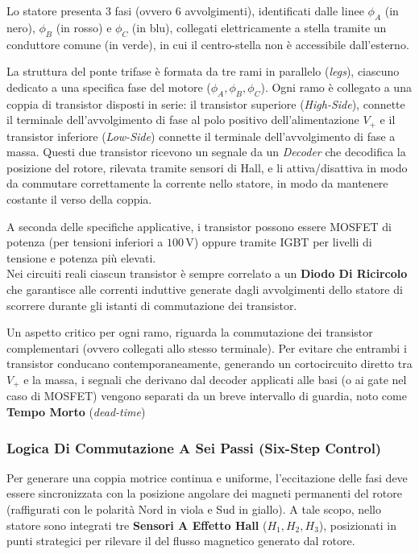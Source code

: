 ﻿\documentclass[11pt, a4paper]{article}
\begin{document}
Lo statore presenta 3 fasi (ovvero 6 avvolgimenti), identificati dalle linee $\phi_A$ (in nero), $\phi_B$ (in rosso) e $\phi_C$ (in blu), collegati elettricamente a stella tramite un conduttore comune (in verde), in cui il centro-stella non è accessibile dall'esterno.

La struttura del ponte trifase è formata da tre rami in parallelo (\textit{legs}), ciascuno dedicato a una specifica fase del motore ($\phi_A, \phi_B, \phi_C$). Ogni ramo è collegato a una coppia di transistor disposti in serie: il transistor superiore (\textit{High-Side}), connette il terminale dell'avvolgimento di fase al polo positivo dell'alimentazione $V_{+}$ e il transistor inferiore (\textit{Low-Side}) connette il terminale dell'avvolgimento di fase a massa. Questi due transistor ricevono un segnale da un \textit{Decoder} che decodifica la posizione del rotore, rilevata tramite sensori di Hall, e li attiva/disattiva in modo da commutare correttamente la corrente nello statore, in modo da mantenere costante il verso della coppia.

A seconda delle specifiche applicative, i transistor possono essere MOSFET di potenza (per tensioni inferiori a $100\,\si{\volt}$) oppure tramite IGBT per livelli di tensione e potenza più elevati.\\
Nei circuiti reali ciascun transistor è sempre correlato a un \textbf{Diodo Di Ricircolo} che garantisce alle correnti induttive generate dagli avvolgimenti dello statore di scorrere durante gli istanti di commutazione dei transistor.

Un aspetto critico per ogni ramo, riguarda la commutazione dei transistor complementari (ovvero collegati allo stesso terminale). Per evitare che entrambi i transistor conducano contemporaneamente, generando un cortocircuito diretto tra $V_+$ e la massa, i segnali che derivano dal decoder applicati alle basi (o ai gate nel caso di MOSFET) vengono separati da un breve intervallo di guardia, noto come \textbf{Tempo Morto} (\textit{dead-time})

\newpage

\subsubsection{Logica Di Commutazione A Sei Passi (Six-Step Control)}
Per generare una coppia motrice continua e uniforme, l'eccitazione delle fasi deve essere sincronizzata con la posizione angolare dei magneti permanenti del rotore (raffigurati con le polarità Nord in viola e Sud in giallo). A tale scopo, nello statore sono integrati tre \textbf{Sensori A Effetto Hall} ($H_1, H_2, H_3$), posizionati in punti strategici per rilevare il del flusso magnetico generato dal rotore.
\end{document}
